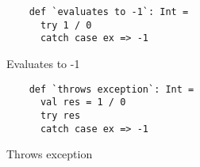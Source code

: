 % 
%  
% 



\begin{algorithm}
    \begin{minipage}{0.40\textwidth}
    \begin{verbatim}
    def `evaluates to -1`: Int =
      try 1 / 0
      catch case ex => -1
    \end{verbatim}
    \caption{Evaluates to -1}
    \end{minipage}
    \hspace{0.05\textwidth}
    \begin{minipage}{0.40\textwidth}
    \vspace{0.05\textwidth}
    \begin{verbatim}
    def `throws exception`: Int =
      val res = 1 / 0
      try res
      catch case ex => -1
    \end{verbatim}
    \caption{Throws exception}
    \end{minipage}

    \caption{Throwing exceptions breaks referential transparency. %
    \label{rt:exceptions}}
\end{algorithm}